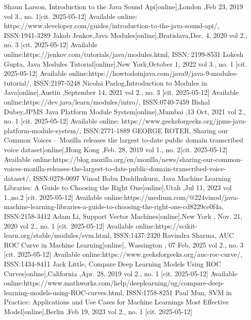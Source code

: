 \documentclass[english,12pt,oneside,a4paper]{article}
\begin{document}
\begin{thebibliography}{15}
		Shaun Larson, Introduction to the Java Sound Api[online],London ,Feb 23, 2019 vol 3., no. 1[cit. 2025-05-12]
		Available online: https://www.developer.com/guides/introduction-to-the-java-sound-api/, ISSN:1941-3289
		Jakob Jenkov,Java Modules[online],Bratislava,Dec. 4, 2020 vol 2., no. 3 [cit. 2025-05-12] Available online:https://jenkov.com/tutorials/java/modules.html, ISSN: 2199-8531
		Lokesh Gupta, Java Modules Tutorial[online],New York,October 1, 2022 vol 3., no. 1 [cit. 2025-05-12]
		Available online:https://howtodoinjava.com/java9/java-9-modules-tutorial/, ISSN:2197-5248
		Nicolai Parlog,Introduction to Modules in Java[online],Austin ,September 14, 2021 vol 2., no. 3 [cit. 2025-05-12]
		Available online:https://dev.java/learn/modules/intro/, ISSN:0740-7459
		Bishal Dubey,JPMS Java Platform Module System[online],Mumbai ,13 Oct, 2021 vol 2., no. 1 [cit. 2025-05-12]
		Available online: https://www.geeksforgeeks.org/jpms-java-platform-module-system/, ISSN:2771-1889
		GEORGE ROTER, Sharing our Common Voices – Mozilla releases the largest to-date public domain transcribed voice dataset[online],Hong Kong ,Feb. 28, 2019 vol 1., no. 2[cit. 2025-05-12]
		Available online:https://blog.mozilla.org/en/mozilla/news/sharing-our-common-voices-mozilla-releases-the-largest-to-date-public-domain-transcribed-voice-dataset/, ISSN:0278-0097
		Vinod Babu Duddhukuru, Java Machine Learning Libraries: A Guide to Choosing the Right One[online],Utah ,Jul 11, 2023 vol 1.,no.2 [cit. 2025-05-12]
		Available online:https://medium.com/@224vinod/java-machine-learning-libraries-a-guide-to-choosing-the-right-one-cd8229ce0f4a, ISSN:2158-3412
		Adam Li, Support Vector Machines[online],New York , Nov. 21, 2020 vol 2., no. 1 [cit. 2025-05-12]
		Available online:https://scikit-learn.org/stable/modules/svm.html, ISSN:1437-2320
		Ravindra Sharma, AUC ROC Curve in Machine Learning[online], Wassington , 07 Feb, 2025 vol 2., no. 3 [cit. 2025-05-12]
		Available online:https://www.geeksforgeeks.org/auc-roc-curve/, ISSN:1434-8411
		Jack Little, Compare Deep Learning Models Using ROC Curves[online],California ,Apr. 28, 2019 vol 2., no. 1 [cit. 2025-05-12]
		Available online:https://www.mathworks.com/help/deeplearning/ug/compare-deep-learning-models-using-ROC-curves.html, ISSN:1758-8251
		Paul Mun, SVM in Practice: Applications and Use Cases for Machine Learnings Most Effective Model[online],Berlin ,Feb 19, 2023 vol 2., no. 1 [cit. 2025-05-12]

\end{thebibliography}
\end{document}
